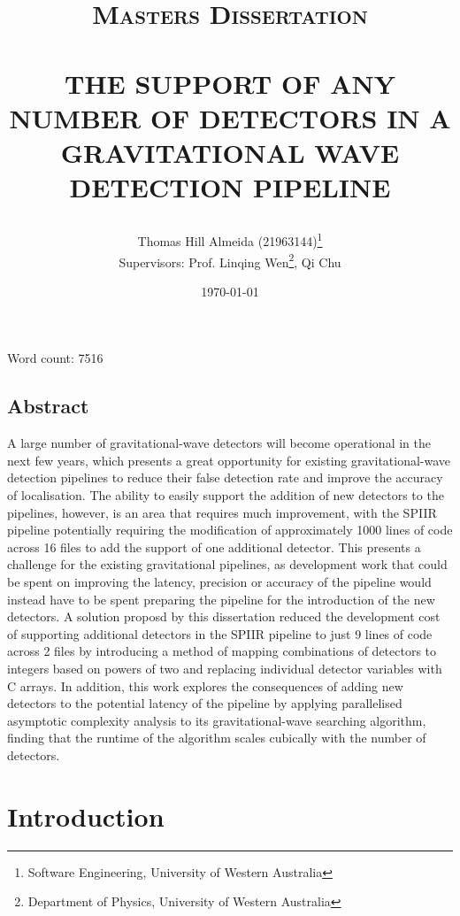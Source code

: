 \documentclass{article}
\title{\normalsize \textsc{Masters Dissertation}
        \\ [1.5cm]
        \HRule{0.5pt} \\
        \LARGE \textbf{\uppercase{The support of any number of detectors in a gravitational wave detection pipeline}}
        \HRule{2pt} \\ [0.5cm]
        \normalsize \date{\today} \vspace*{2\baselineskip}}
\author{Thomas Hill Almeida (21963144)\thanks{Software Engineering, University of Western Australia}\\
\small{Supervisors: Prof. Linqing Wen\thanks{Department of Physics, University of Western Australia}, Qi Chu\footnotemark[2]}}
\date{}
\begin{document}
\maketitle{}
\begin{center}
    Word count: 7516
\end{center}
\newpage{}
\tableofcontents{}
\listoffigures{}
\listoftables{}
\newpage{}

\begin{center}
    \begin{minipage}[t]{0.6\textwidth}
        \section*{Abstract} \label{sec:abstract}
        A large number of gravitational-wave detectors will become operational in the next few years, which presents a great opportunity for existing gravitational-wave detection pipelines to reduce their false detection rate and improve the accuracy of localisation.
        The ability to easily support the addition of new detectors to the pipelines, however, is an area that requires much improvement, with the SPIIR pipeline potentially requiring the modification of approximately 1000 lines of code across 16 files to add the support of one additional detector.
        This presents a challenge for the existing gravitational pipelines, as development work that could be spent on improving the latency, precision or accuracy of the pipeline would instead have to be spent preparing the pipeline for the introduction of the new detectors.
        A solution proposd by this dissertation reduced the development cost of supporting additional detectors in the SPIIR pipeline to just 9 lines of code across 2 files by introducing a method of mapping combinations of detectors to integers based on powers of two and replacing individual detector variables with C arrays.
        In addition, this work explores the consequences of adding new detectors to the potential latency of the pipeline by applying parallelised asymptotic complexity analysis to its gravitational-wave searching algorithm, finding that the runtime of the algorithm scales cubically with the number of detectors.
    \end{minipage}
\end{center}

\section{Introduction} \label{sec:introduction}
\end{document}
